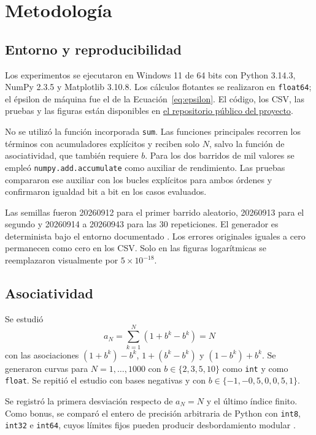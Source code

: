 \documentclass[11pt,a4paper]{article}
\newcommand{\codigo}[1]{\texttt{#1}}
\begin{document}
\section{Metodología}

\subsection{Entorno y reproducibilidad}

Los experimentos se ejecutaron en Windows 11 de 64 bits con Python 3.14.3, NumPy 2.3.5 y Matplotlib 3.10.8. Los cálculos flotantes se realizaron en \codigo{float64}; el épsilon de máquina fue el de la Ecuación~\ref{eq:epsilon}. El código, los CSV, las pruebas y las figuras están disponibles en \href{https://github.com/Stefano936/Tarea-Error-Numerico}{el repositorio público del proyecto}.

No se utilizó la función incorporada \codigo{sum}. Las funciones principales recorren los términos con acumuladores explícitos y reciben solo $N$, salvo la función de asociatividad, que también requiere $b$. Para los dos barridos de mil valores se empleó \codigo{numpy.add.accumulate} como auxiliar de rendimiento. Las pruebas compararon ese auxiliar con los bucles explícitos para ambos órdenes y confirmaron igualdad bit a bit en los casos evaluados.

Las semillas fueron 20260912 para el primer barrido aleatorio, 20260913 para el segundo y 20260914 a 20260943 para las 30 repeticiones. El generador es determinista bajo el entorno documentado \citep{pythonrandom2026}. Los errores originales iguales a cero permanecen como cero en los CSV. Solo en las figuras logarítmicas se reemplazaron visualmente por $5\times10^{-18}$.

\subsection{Asociatividad}

Se estudió
\begin{equation}
a_N=\sum_{k=1}^{N}(1+b^k-b^k)=N
\label{eq:aN}
\end{equation}
con las asociaciones $(1+b^k)-b^k$, $1+(b^k-b^k)$ y $(1-b^k)+b^k$. Se generaron curvas para $N=1,\ldots,1000$ con $b\in\{2,3,5,10\}$ como \codigo{int} y como \codigo{float}. Se repitió el estudio con bases negativas y con $b\in\{-1,-0{,}5,0,0{,}5,1\}$.

Se registró la primera desviación respecto de $a_N=N$ y el último índice finito. Como bonus, se comparó el entero de precisión arbitraria de Python con \codigo{int8}, \codigo{int32} e \codigo{int64}, cuyos límites fijos pueden producir desbordamiento modular \citep{pythonint2026,numpytypes2026}.
\end{document}
